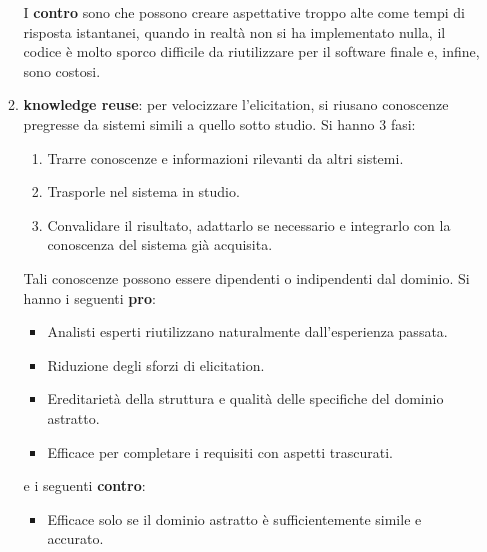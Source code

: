 \begin{itemize}
\begin{enumerate}
                        I \textbf{contro} sono che possono creare aspettative
                        troppo alte come tempi di risposta istantanei, quando in
                        realtà non si ha implementato nulla, il codice è molto
                        sporco difficile da riutilizzare per il software finale
                        e, infine, sono costosi.
                  \item \textbf{knowledge reuse}: per velocizzare l'elicitation,
                        si riusano conoscenze pregresse da sistemi simili a quello
                        sotto studio. Si hanno 3 fasi:
                        \begin{enumerate}
                              \item Trarre conoscenze e informazioni rilevanti
                                    da altri sistemi.
                              \item Trasporle nel sistema in studio.
                              \item Convalidare il risultato, adattarlo se
                                    necessario e integrarlo con la conoscenza del
                                    sistema già acquisita.
                        \end{enumerate}
                        Tali conoscenze possono essere dipendenti o indipendenti
                        dal dominio. Si hanno i seguenti \textbf{pro}:
                        \begin{itemize}
                              \item Analisti esperti riutilizzano naturalmente
                                    dall'esperienza passata.
                              \item Riduzione degli sforzi di elicitation.
                              \item Ereditarietà della struttura e qualità delle
                                    specifiche del dominio astratto.
                              \item Efficace per completare i requisiti con aspetti
                                    trascurati.
                        \end{itemize}
                        e i seguenti \textbf{contro}:
                        \begin{itemize}
                              \item Efficace solo se il dominio astratto è
                                    sufficientemente simile e accurato.

\end{itemize}
\end{enumerate}
\end{itemize}
